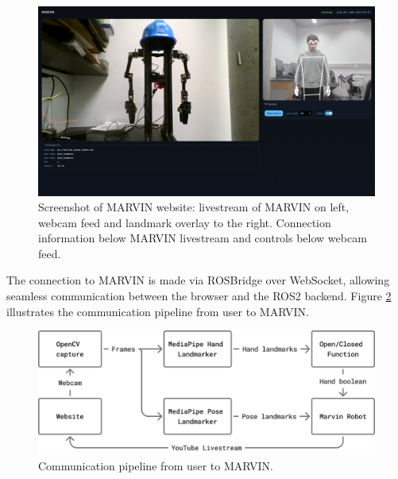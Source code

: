 \documentclass[acmsmall, screen]{acmart}
\begin{document}
\begin{figure}[htbp]
  \centering
  \includegraphics[width=\linewidth]{assets/web} %
  \caption{Screenshot of MARVIN website: livestream of MARVIN on left, webcam feed and landmark overlay to the right. Connection information below MARVIN livestream and controls below webcam feed.}
  \label{fig:web}
\end{figure}

The connection to MARVIN is made via ROSBridge over WebSocket, allowing seamless communication between the browser and the ROS2 backend. 
Figure \ref{fig:pipeline} illustrates the communication pipeline from user to MARVIN.

\begin{figure}[htbp]
  \centering
  \includegraphics[width=.8\linewidth]{assets/MARVIN Communication Pipeline}
  \caption{Communication pipeline from user to MARVIN.}
  \label{fig:pipeline}
\end{figure}

\end{document}

